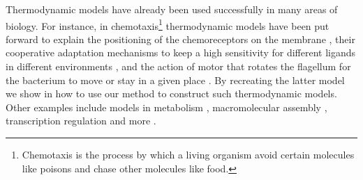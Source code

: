 Thermodynamic models have already been used successfully
in many areas of biology.
For instance, in chemotaxis\footnote{
  Chemotaxis is the process by which a living organism
  avoid certain molecules like poisons and
  chase other molecules like food.}
thermodynamic models have been put forward to explain
the positioning of the chemoreceptors on the membrane \citep{wingreen},
their cooperative adaptation mechanisms to keep a high sensitivity
for different ligands in different environments \citep{sourjik},
and the action of motor that rotates the flagellum
for the bacterium to move or stay in a given place \citep{teuta}.
By recreating the latter model we show in 
how to use our method to construct such thermodynamic models.
Other examples include models in metabolism \citep{seba-tca,cannon},
macromolecular assembly \citep{saiz},
transcription regulation \citep{bintu}
and more \citep{kiselev}.

